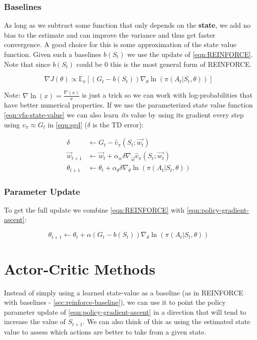 \documentclass[11pt]{report}
\begin{document}
\subsubsection{Baselines}\label{sec:reinforce-baseline}
As long as we subtract some function that only depends on the \textbf{state}, we add no bias to the estimate and can improve the variance and thus get faster convergence. A good choice for this is some approximation of the state value function. Given such a baselines $b(S_t)$ we use the update of \autoref{eqn:REINFORCE}. Note that since $b(S_t)$ could be 0 this is the most general form of REINFORCE.


\begin{equation}
	\label{eqn:REINFORCE}
	\nabla J(\theta) \propto \mathbb{E}_\pi\left[\left(G_t - b(S_t)\right)\nabla_\theta \ln(\pi(A_t | S_t, \theta))\right]
\end{equation}

Note: $\nabla \ln(x) = \frac{\nabla(x)}{x}$ is just a trick so we can work with log-probabilities that have better numerical properties. If we use the parameterized state value function \autoref{eqn:vfa-state-value} we can also learn \textit{its} value by using its gradient every step using $v_\pi \approx G_t$ in \autoref{eqn:sgd} ($\delta$ is the TD error):

\begin{align}
	\delta &\xleftarrow{} G_t - \hat{v}_\pi(S_t; \vec{w_t})\\
	\label{eqn:reinforce-baseline-w}
	\vec{w}_{t+1} &\xleftarrow{} \vec{w}_t + \alpha_{w} \delta \nabla_{\vec{w}} \hat{v}_\pi(S_t; \vec{w_t})\\
	\label{eqn:reinforce-baseline-theta}
	\theta_{t+1} &\xleftarrow{} \theta_{t} + \alpha_\theta \delta \nabla_\theta \ln(\pi(A_t | S_t, \theta))
\end{align}

\subsubsection{Parameter Update}

To get the full update we combine \autoref{eqn:REINFORCE} with \autoref{eqn:policy-gradient-ascent}:

\begin{equation}
	\theta_{t+1} \xleftarrow{} \theta_t + \alpha\left(G_t - b(S_t)\right)\nabla_\theta\ln(\pi(A_t | S_t, \theta))
\end{equation}

\section{Actor-Critic Methods}\label{sec:actor-critic}
Instead of simply using a learned state-value as a baseline (as in REINFORCE with baselines - \autoref{sec:reinforce-baseline}), we can use it to point the policy parameter update of \autoref{eqn:policy-gradient-ascent} in a direction that will tend to increase the value of $S_{t+1}$. We can also think of this as using the estimated state value to assess which actions are better to take from a given state.
\end{document}
